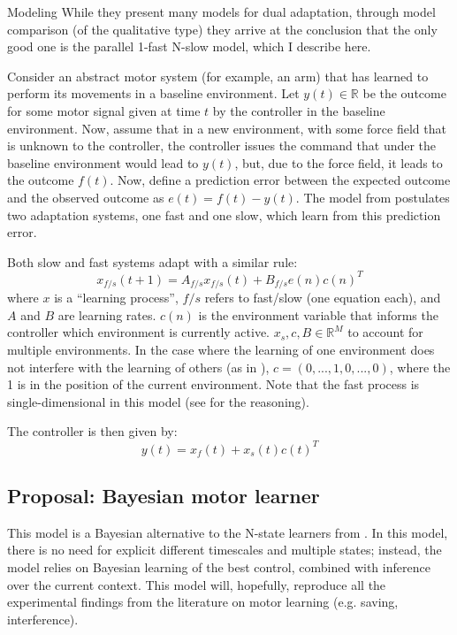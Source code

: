 \documentclass{report}
\begin{document}
\begin{chapter}{Modeling}
While they present many models for dual adaptation, through model comparison (of
the qualitative type) they arrive at the conclusion that the only good one is
the parallel 1-fast N-slow model, which I describe here.

Consider an abstract motor system (for example, an arm) that has learned to
perform its movements in a baseline environment. Let $y(t) \in \mathbb{R}$ be
the outcome for some motor signal given at time $t$ by the controller in the
baseline environment. Now, assume that in a new environment, with some force
field that is unknown to the controller, the controller issues the command that
under the baseline environment would lead to $y(t)$, but, due to the force
field, it leads to the outcome $f(t)$. Now, define a prediction error between
the expected outcome and the observed outcome as $e(t) = f(t) - y(t)$. The model
from \cite{Lee_Dual_2009} postulates two adaptation systems, one fast and one
slow, which learn from this prediction error.

Both slow and fast systems adapt with a similar rule:
\[
x_{f/s}(t + 1) = A_{f/s}x_{f/s}(t) + B_{f/s}e(n)c(n)^T \label{eqn:lee-learn}
\]
where $x$ is a ``learning process'', $f/s$ refers to fast/slow (one equation
each), and $A$ and $B$ are learning rates. $c(n)$ is the environment variable
that informs the controller which environment is currently active.
$x_s,c, B \in \mathbb{R}^M$ to account for multiple environments. In the case
where the learning of one environment does not interfere with the learning of
others (as in \cite{Lee_Dual_2009}), $c = (0, ..., 1, 0, ..., 0)$, where the 1
is in the position of the current environment. Note that the fast process is
single-dimensional in this model (see \citep{Lee_Dual_2009} for the reasoning).

The controller is then given by:
\[
y(t) = x_f(t) + x_s(t)c(t)^T
\]

\subsection{Proposal: Bayesian motor learner}
\label{subsec:proposal}
This model is a Bayesian alternative to the N-state learners from
\cite{Lee_Dual_2009}. In this model, there is no need for explicit different
timescales and multiple states; instead, the model relies on Bayesian learning
of the best control, combined with inference over the current context. This
model will, hopefully, reproduce all the experimental findings from the
literature on motor learning (e.g. saving, interference).


\end{chapter}
\end{document}
